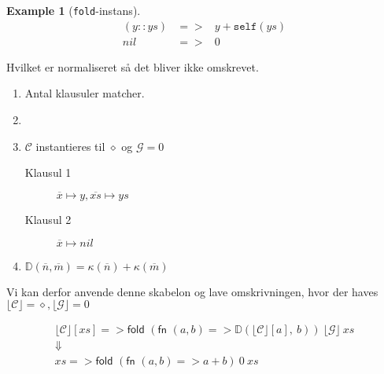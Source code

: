 \documentclass[oneside]{memoir}
\newcommand{\floor}[1]{\ensuremath{\lfloor #1 \rfloor}}
\theoremstyle{definition}
\newtheorem{example}{Example}
\begin{document}
\begin{example}[\texttt{fold}-instans]

  \begin{eqnarray*}
    (y::ys) &=>& y + \mathtt{self} \left( ys \right) \\
    nil &=>& 0
  \end{eqnarray*}

  Hvilket er normaliseret så det bliver ikke omskrevet.

  \begin{enumerate}
  \item Antal klausuler matcher.

  \item 

  \item $\mathcal{C}$ instantieres til $\diamond$ og $\mathcal{G} = 0$

    \begin{description}
    \item[Klausul 1] $\overline{x} \mapsto y, \overline{xs} \mapsto ys$
      
    \item[Klausul 2] $\overline{x} \mapsto nil$
    \end{description}
    
    
  \item $\mathbb{D}(\overline{n}, \overline{m}) = \kappa(\overline{n}) +
    \kappa(\overline{m})$
  \end{enumerate}

  Vi kan derfor anvende denne skabelon og lave omskrivningen, hvor der haves
  $\floor{\mathcal{C}} = \diamond, \floor{\mathcal{G}} = 0$

  \begin{eqnarray*}[c]
     \floor{\mathcal{C}} [xs]  => \textsf{fold } \left( \textsf{fn } (a,b) =>
      \mathbb{D}\left( \floor{\mathcal{C}}[a],\ b \right) \right) \
    \floor{\mathcal{G}} \ xs \\
    \Downarrow \\
    xs => \textsf{fold } \left( \textsf{fn } (a,b) => a+b
    \right) \ 0 \ xs
  \end{eqnarray*}
  
\end{example}
\end{document}
